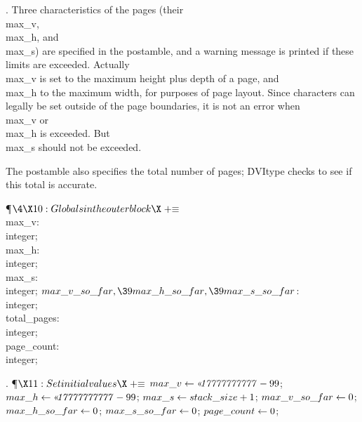 . Three characteristics of the pages (their \\{max\_v}, \\{max\_h}, and
\\{max\_s}) are specified in the postamble, and a warning message
is printed if these limits are exceeded. Actually \\{max\_v} is set to
the maximum height plus depth of a page, and \\{max\_h} to the maximum width,
for purposes of page layout. Since characters can legally be set outside
of the page boundaries, it is not an error when \\{max\_v} or \\{max\_h} is
exceeded. But \\{max\_s} should not be exceeded.

The postamble also specifies the total number of pages; \.{DVItype}
checks to see if this total is accurate.

\Y\P$\4\X10:Globals in the outer block\X\mathrel{+}\S$\6
\4\\{max\_v}: \\{integer};\6
\4\\{max\_h}: \\{integer};\6
\4\\{max\_s}: \\{integer};\6
\4$\\{max\_v\_so\_far},\39\\{max\_h\_so\_far},\39\\{max\_s\_so\_far}$: %
\\{integer};\6
\4\\{total\_pages}: \\{integer};\6
\4\\{page\_count}: \\{integer};\par
\fi

. \P$\X11:Set initial values\X\mathrel{+}\S$\6
$\\{max\_v}\K\O{17777777777}-99$;\5
$\\{max\_h}\K\O{17777777777}-99$;\5
$\\{max\_s}\gets\\{stack\_size}+1$;\6
$\\{max\_v\_so\_far}\gets0$;\5
$\\{max\_h\_so\_far}\gets0$;\5
$\\{max\_s\_so\_far}\gets0$;\5
$\\{page\_count}\gets0$;\par
\fi

